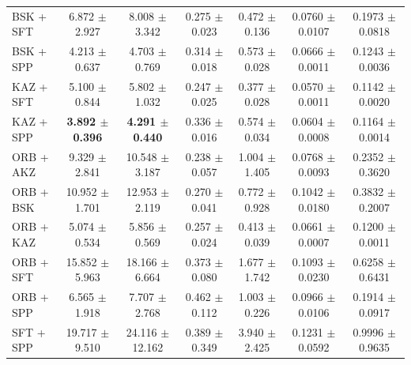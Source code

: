 \begin{table}[hbp]
\begin{tabular}{lcccccc}
BSK + SFT & 6.872 $\pm$ 2.927 & 8.008 $\pm$ 3.342 & 0.275 $\pm$ 0.023 & 0.472 $\pm$ 0.136 & 0.0760 $\pm$ 0.0107 & 0.1973 $\pm$ 0.0818 \\
BSK + SPP & 4.213 $\pm$ 0.637 & 4.703 $\pm$ 0.769 & 0.314 $\pm$ 0.018 & 0.573 $\pm$ 0.028 & 0.0666 $\pm$ 0.0011 & 0.1243 $\pm$ 0.0036 \\
KAZ + SFT & 5.100 $\pm$ 0.844 & 5.802 $\pm$ 1.032 & 0.247 $\pm$ 0.025 & 0.377 $\pm$ 0.028 & 0.0570 $\pm$ 0.0011 & 0.1142 $\pm$ 0.0020 \\
KAZ + SPP & \textbf{3.892 $\pm$ 0.396} & \textbf{4.291 $\pm$ 0.440} & 0.336 $\pm$ 0.016 & 0.574 $\pm$ 0.034 & 0.0604 $\pm$ 0.0008 & 0.1164 $\pm$ 0.0014 \\
ORB + AKZ & 9.329 $\pm$ 2.841 & 10.548 $\pm$ 3.187 & 0.238 $\pm$ 0.057 & 1.004 $\pm$ 1.405 & 0.0768 $\pm$ 0.0093 & 0.2352 $\pm$ 0.3620 \\
ORB + BSK & 10.952 $\pm$ 1.701 & 12.953 $\pm$ 2.119 & 0.270 $\pm$ 0.041 & 0.772 $\pm$ 0.928 & 0.1042 $\pm$ 0.0180 & 0.3832 $\pm$ 0.2007 \\
ORB + KAZ & 5.074 $\pm$ 0.534 & 5.856 $\pm$ 0.569 & 0.257 $\pm$ 0.024 & 0.413 $\pm$ 0.039 & 0.0661 $\pm$ 0.0007 & 0.1200 $\pm$ 0.0011 \\
ORB + SFT & 15.852 $\pm$ 5.963 & 18.166 $\pm$ 6.664 & 0.373 $\pm$ 0.080 & 1.677 $\pm$ 1.742 & 0.1093 $\pm$ 0.0230 & 0.6258 $\pm$ 0.6431 \\
ORB + SPP & 6.565 $\pm$ 1.918 & 7.707 $\pm$ 2.768 & 0.462 $\pm$ 0.112 & 1.003 $\pm$ 0.226 & 0.0966 $\pm$ 0.0106 & 0.1914 $\pm$ 0.0917 \\
SFT + SPP & 19.717 $\pm$ 9.510 & 24.116 $\pm$ 12.162 & 0.389 $\pm$ 0.349 & 3.940 $\pm$ 2.425 & 0.1231 $\pm$ 0.0592 & 0.9996 $\pm$ 0.9635 \\
\bottomrule
\end{tabular}
\end{table}